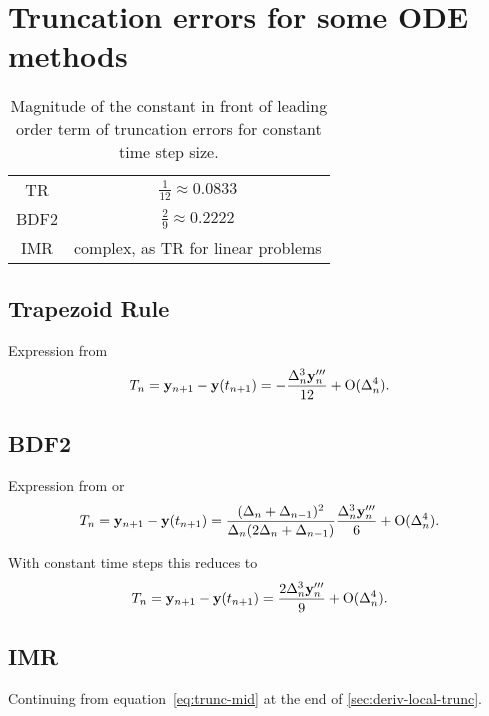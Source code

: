 \chapter{Truncation errors for some ODE methods}

\begin{table}[h]
  \centering
  \begin{tabular}{c|c}
    TR & $\frac{1}{12} \approx 0.0833$ \\
    BDF2 & $\frac{2}{9} \approx 0.2222$ \\
    IMR & complex, as TR for linear problems
  \end{tabular}
  \caption{Magnitude of the constant in front of leading order term of truncation errors for constant time step size.}
  \label{tab:truncation-errors}
\end{table}

\section{Trapezoid Rule}

Expression from \cite[pg. 261]{GreshoSani}
\begin{equation}
  \label{eq:tr-lte-conststep}
  T_n = \mathbf{y}_{n+1} - \mathbf{y}(t_{n+1}) = -\frac{\Delta_{n}^3 \mathbf{y}_n'''}{12}
  + \text{O}(\Delta_{n}^4).
\end{equation}

\section{BDF2}

Expression from \cite[pg. 715]{GreshoSani} or \cite[eq. (2.43)]{Prinja2010}
\begin{equation}
  \label{eq:bdf2-lte}
  T_n = \mathbf{y}_{n+1} - \mathbf{y}(t_{n+1}) = \frac{(\Delta_{n} + \Delta_{n-1})^2}{\Delta_{n}(2\Delta_{n} + \Delta_{n-1})}
  \frac{\Delta_{n}^3 \mathbf{y}_n'''}{6}
  + \text{O}(\Delta_{n}^4).
\end{equation}

With constant time steps this reduces to
\begin{equation}
  \label{eq:bdf2-lte}
  T_n = \mathbf{y}_{n+1} - \mathbf{y}(t_{n+1}) =  \frac{2\Delta_{n}^3 \mathbf{y}_n'''}{9}
  + \text{O}(\Delta_{n}^4).
\end{equation}

\section{IMR}
\label{sec:full-imr-lte-calculation}

Continuing from equation~\eqref{eq:trunc-mid} at the end of \autoref{sec:deriv-local-trunc}.

